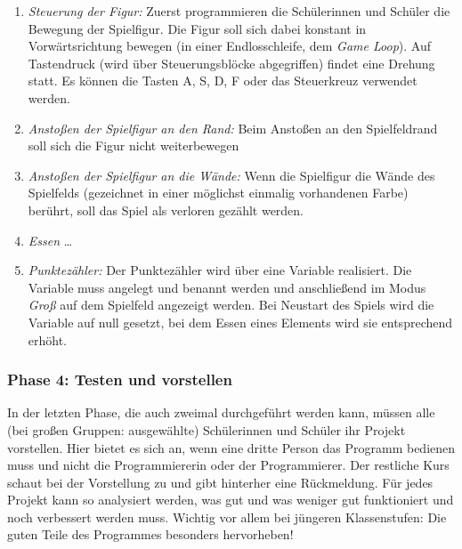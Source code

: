 \begin{enumerate}
\item
  \emph{Steuerung der Figur:} Zuerst programmieren die Schülerinnen und
  Schüler die Bewegung der Spielfigur. Die Figur soll sich dabei
  konstant in Vorwärtsrichtung bewegen (in einer Endlosschleife, dem
  \emph{Game Loop}). Auf Tastendruck (wird über Steuerungsblöcke
  abgegriffen) findet eine Drehung statt. Es können die Tasten A, S, D,
  F oder das Steuerkreuz verwendet werden.
\item
  \emph{Anstoßen der Spielfigur an den Rand:} Beim Anstoßen an den
  Spielfeldrand soll sich die Figur nicht weiterbewegen
\item
  \emph{Anstoßen der Spielfigur an die Wände:} Wenn die Spielfigur die
  Wände des Spielfelds (gezeichnet in einer möglichst einmalig
  vorhandenen Farbe) berührt, soll das Spiel als verloren gezählt
  werden.
\item
  \emph{Essen} \ldots{}
\item
  \emph{Punktezähler:} Der Punktezähler wird über eine Variable
  realisiert. Die Variable muss angelegt und benannt werden und
  anschließend im Modus \emph{Groß} auf dem Spielfeld angezeigt werden.
  Bei Neustart des Spiels wird die Variable auf null gesetzt, bei dem
  Essen eines Elements wird sie entsprechend erhöht.
\end{enumerate}

\subsubsection{Phase 4: Testen und
vorstellen}\label{phase-4-testen-und-vorstellen}

In der letzten Phase, die auch zweimal durchgeführt werden kann, müssen
alle (bei großen Gruppen: ausgewählte) Schülerinnen und Schüler ihr
Projekt vorstellen. Hier bietet es sich an, wenn eine dritte Person das
Programm bedienen muss und nicht die Programmiererin oder der
Programmierer. Der restliche Kurs schaut bei der Vorstellung zu und gibt
hinterher eine Rückmeldung. Für jedes Projekt kann so analysiert werden,
was gut und was weniger gut funktioniert und noch verbessert werden
muss. Wichtig vor allem bei jüngeren Klassenstufen: Die guten Teile des
Programmes besonders hervorheben!

